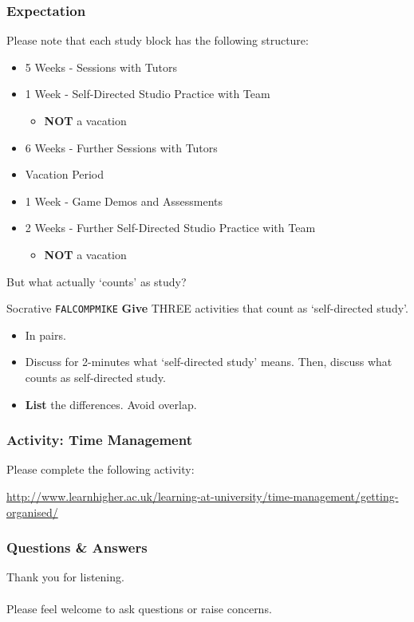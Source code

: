 \begin{frame}
	\frametitle{Expectation}
	
	Please note that each study block has the following structure:
	
	\begin{itemize}
		\item 5 Weeks - Sessions with Tutors
		\item 1 Week - Self-Directed Studio Practice with Team
		\begin{itemize}
			\item \textbf{NOT} a vacation
		\end{itemize}
		\item 6 Weeks - Further Sessions with Tutors
		\item Vacation Period
		\item 1 Week - Game Demos and Assessments
		\item 2 Weeks - Further Self-Directed Studio Practice with Team
		\begin{itemize}
			\item \textbf{NOT} a vacation
		\end{itemize}
	\end{itemize}
	
	But what actually `counts' as study?

\end{frame}

\begin{frame}{Socrative \texttt{FALCOMPMIKE}}
	\textbf{Give} THREE activities that count as `self-directed study'.
	
	\begin{itemize}
		\item In pairs.
		\item Discuss for 2-minutes what `self-directed study' means. Then, discuss what counts as self-directed study.
		\item \textbf{List} the differences. Avoid overlap.
	\end{itemize}
\end{frame}


\begin{frame}
	\frametitle{Activity: Time Management}
	
	Please complete the following activity:
	
	\vspace{2em}
	
	\url{http://www.learnhigher.ac.uk/learning-at-university/time-management/getting-organised/}

\end{frame}

\begin{frame}
	\frametitle{Questions \& Answers}	
	\begin{center}
		Thank you for listening. 
		\\~\\
		Please feel welcome to ask questions or raise concerns.
	\end{center}
\end{frame}


